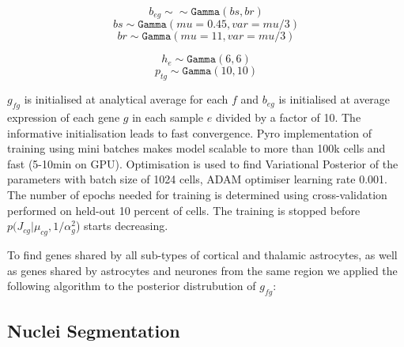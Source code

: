 \documentclass[11pt,a4paper]{article}
\begin{document}
\begin{equation} \label{eq:c2l_ref_prog_diff:5}
b_{eg} \sim \sim \mathtt{Gamma}(bs, br)
\end{equation}
\begin{equation} \label{eq:c2l_ref_prog_diff:6}
bs \sim \mathtt{Gamma}(mu=0.45, var=mu/3)
\end{equation}
\begin{equation} \label{eq:c2l_ref_prog_diff:7}
br \sim \mathtt{Gamma}(mu=11, var=mu/3)
\end{equation}

\begin{equation} \label{eq:c2l_ref_prog_diff:8}
h_e \sim \mathtt{Gamma}(6, 6)
\end{equation}
\begin{equation} \label{eq:c2l_ref_prog_diff:9}
p_{tg} \sim \mathtt{Gamma}(10, 10)
\end{equation}

$g_{fg}$ is initialised at analytical average for each $f$ and $b_{eg}$ is initialised at average expression of each gene $g$ in each sample $e$ divided by a factor of 10. The informative initialisation leads to fast convergence.  \newline
Pyro implementation of training using mini batches makes model scalable to more than 100k cells and fast (5-10min on GPU). Optimisation is used to find Variational Posterior of the parameters with batch size of 1024 cells, ADAM optimiser learning rate 0.001. The number of epochs needed for training is determined using cross-validation performed on held-out 10 percent of cells. The training is stopped before $p(J_{cg} | \mu_{cg}, 1 / \alpha_g^2$) starts decreasing. \newline

To find genes shared by all sub-types of cortical and thalamic astrocytes, as well as genes shared by astrocytes and neurones from the same region we applied the following algorithm to the posterior distrubution of $g_{fg}$:


\subsection{Nuclei Segmentation} \label{c2l_segmentation}
\end{document}
